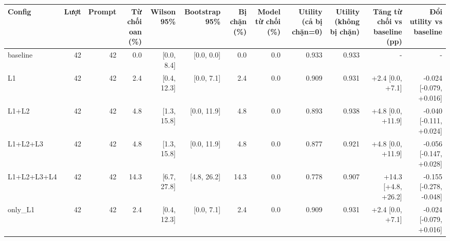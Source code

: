 \begin{tabular}{lrrrrrrrrrrr}
\toprule
Config & Lượt & Prompt & Từ chối oan (\%) & Wilson 95\% & Bootstrap 95\% & Bị chặn (\%) & Model từ chối (\%) & Utility (cả bị chặn=0) & Utility (không bị chặn) & Tăng từ chối vs baseline (pp) & Đổi utility vs baseline \\
\midrule
baseline & 42 & 42 & 0.0 & [0.0, 8.4] & [0.0, 0.0] & 0.0 & 0.0 & 0.933 & 0.933 & - & - \\
L1 & 42 & 42 & 2.4 & [0.4, 12.3] & [0.0, 7.1] & 2.4 & 0.0 & 0.909 & 0.931 & +2.4 [0.0, +7.1] & -0.024 [-0.079, +0.016] \\
L1+L2 & 42 & 42 & 4.8 & [1.3, 15.8] & [0.0, 11.9] & 4.8 & 0.0 & 0.893 & 0.938 & +4.8 [0.0, +11.9] & -0.040 [-0.111, +0.024] \\
L1+L2+L3 & 42 & 42 & 4.8 & [1.3, 15.8] & [0.0, 11.9] & 4.8 & 0.0 & 0.877 & 0.921 & +4.8 [0.0, +11.9] & -0.056 [-0.147, +0.028] \\
L1+L2+L3+L4 & 42 & 42 & 14.3 & [6.7, 27.8] & [4.8, 26.2] & 14.3 & 0.0 & 0.778 & 0.907 & +14.3 [+4.8, +26.2] & -0.155 [-0.278, -0.048] \\
only\_L1 & 42 & 42 & 2.4 & [0.4, 12.3] & [0.0, 7.1] & 2.4 & 0.0 & 0.909 & 0.931 & +2.4 [0.0, +7.1] & -0.024 [-0.079, +0.016] \\
\bottomrule
\end{tabular}
